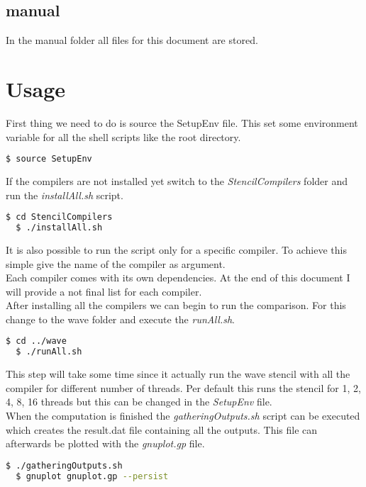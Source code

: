 \documentclass[AEJ]{AEA}
\begin{document}
\subsection{manual}
In the manual folder all files for this document are stored.

\section{Usage}
First thing we need to do is source the SetupEnv file. This set some environment variable for all the shell scripts like the root directory.

\begin{lstlisting}[frame=single,language=bash]
  $ source SetupEnv
\end{lstlisting}

If the compilers are not installed yet switch to the \emph{StencilCompilers} folder and run the \emph{installAll.sh} script. 
\begin{lstlisting}[frame=single,language=bash]
  $ cd StencilCompilers
  $ ./installAll.sh 
\end{lstlisting}

It is also possible to run the script only for a specific compiler. To achieve this simple give the name of the compiler as argument.
\\
Each compiler comes with its own dependencies. At the end of this document I will provide a not final list for each compiler. 
\\
After installing all the compilers we can begin to run the comparison. For this change to the wave folder and execute the \emph{runAll.sh}.

\begin{lstlisting}[frame=single,language=bash]
  $ cd ../wave
  $ ./runAll.sh
\end{lstlisting}

This step will take some time since it actually run the wave stencil with all the compiler for different number of threads. Per default this runs the stencil for 1, 2, 4, 8, 16 threads but this can be changed in the \emph{SetupEnv} file.
\\
When the computation is finished the \emph{gatheringOutputs.sh} script can be executed which creates the result.dat file containing all the outputs. This file can afterwards be plotted with the \emph{gnuplot.gp} file.

\begin{lstlisting}[frame=single,language=bash]
  $ ./gatheringOutputs.sh
  $ gnuplot gnuplot.gp --persist
\end{lstlisting}
\end{document}
